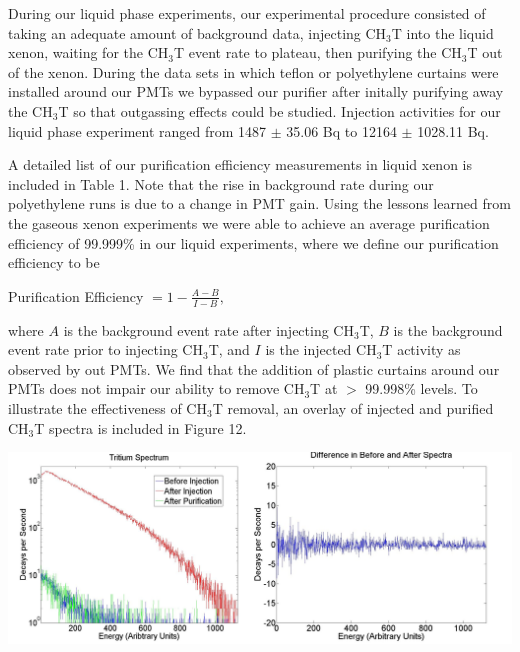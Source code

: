 \documentclass[a4paper,12pt]{article}
\begin{document}
During our liquid phase experiments, our experimental procedure consisted of taking an adequate amount of background data, injecting CH$_3$T into the liquid xenon, waiting for the CH$_3$T event rate to plateau, then purifying the CH$_3$T out of the xenon.  During the data sets in which teflon or polyethylene curtains were installed around our PMTs we bypassed our purifier after initally purifying away the CH$_3$T so that outgassing effects could be studied.  Injection activities for our liquid phase experiment ranged from 1487 $\pm$ 35.06 Bq to 12164 $\pm$ 1028.11 Bq.  

A detailed list of our purification efficiency measurements in liquid xenon is included in Table 1.  Note that the rise in background rate during our polyethylene runs is due to a change in PMT gain.  Using the lessons learned from the gaseous xenon experiments we were able to achieve an average purification efficiency of 99.999\% in our liquid experiments, where we define our purification efficiency to be

\begin{center}
Purification Efficiency $= 1 - \frac{A - B}{I - B},$
\end{center}

\noindent
where $A$ is the background event rate after injecting CH$_3$T, $B$ is the background event rate prior to injecting CH$_3$T, and $I$ is the injected CH$_3$T activity as observed by out PMTs.  We find that the addition of plastic curtains around our PMTs does not impair our ability to remove CH$_3$T at $>$ 99.998\% levels.  To illustrate the effectiveness of CH$_3$T removal, an overlay of injected and purified CH$_3$T spectra is included in Figure 12.  

\begin{center}
\includegraphics[scale=0.5]{spectra.png}
\end{center}
\end{document}
